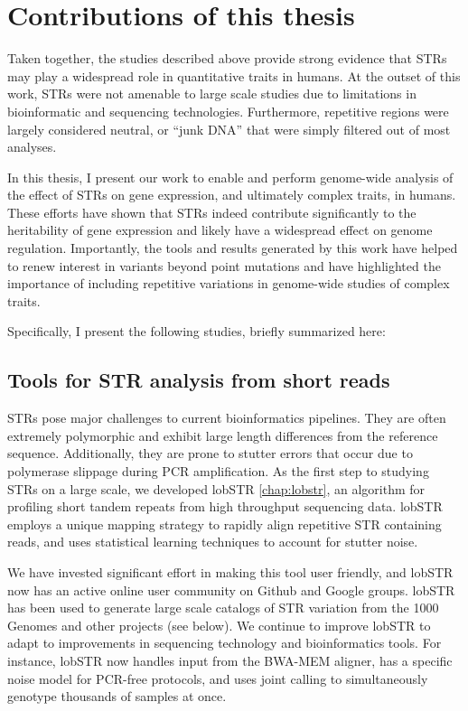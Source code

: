 \section{Contributions of this thesis}
Taken together, the studies described above provide strong evidence that STRs may play a widespread role in quantitative traits in humans. At the outset of this work, STRs were not amenable to large scale studies due to limitations in bioinformatic and sequencing technologies. Furthermore, repetitive regions were largely considered neutral, or ``junk DNA'' that were simply filtered out of most analyses.

In this thesis, I present our work to enable and perform genome-wide analysis of the effect of STRs on gene expression, and ultimately complex traits, in humans. These efforts have shown that STRs indeed contribute significantly to the heritability of gene expression and likely have a widespread effect on genome regulation. Importantly, the tools and results generated by this work have helped to renew interest in variants beyond point mutations and have highlighted the importance of including repetitive variations in genome-wide studies of complex traits. 

Specifically, I present the following studies, briefly summarized here:

\subsection{Tools for STR analysis from short reads}
STRs pose major challenges to current bioinformatics pipelines. They are often extremely polymorphic and exhibit large length differences from the reference sequence. Additionally, they are prone to stutter errors that occur due to polymerase slippage during PCR amplification. As the first step to studying STRs on a large scale, we developed lobSTR \cite{GymrekGolanRossetEtAl2012} \autoref{chap:lobstr}, an algorithm for profiling short tandem repeats from high throughput sequencing data. lobSTR employs a unique mapping strategy to rapidly align repetitive STR containing reads, and uses statistical learning techniques to account for stutter noise.

We have invested significant effort in making this tool user friendly, and lobSTR now has an active online user community on Github and Google groups. lobSTR has been used to generate large scale catalogs of STR variation from the 1000 Genomes and other projects (see below). We continue to improve lobSTR to adapt to improvements in sequencing technology and bioinformatics tools. For instance, lobSTR now handles input from the BWA-MEM aligner, has a specific noise model for PCR-free protocols, and uses joint calling to simultaneously genotype thousands of samples at once.

